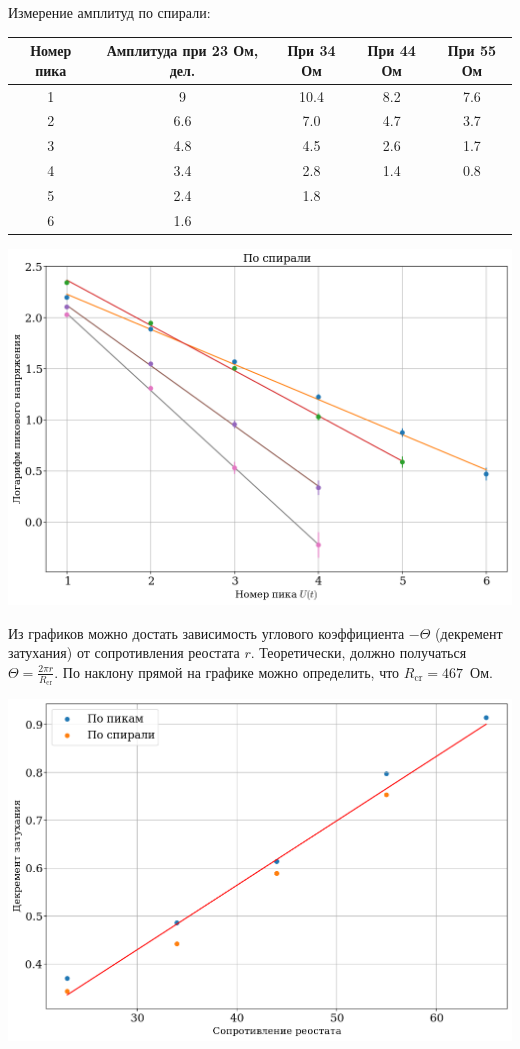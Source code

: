 \documentclass[a4paper, 12pt]{article}
\begin{document}
Измерение амплитуд по спирали:

\begin{tabular}{|c|c|c|c|c|}
\hline
Номер пика & Амплитуда при 23 Ом, дел. & При 34 Ом & При 44 Ом & При 55 Ом \\ \hline
1 & 9    & 10.4 & 8.2 & 7.6  \\ \hline
2 & 6.6  & 7.0  & 4.7 & 3.7  \\ \hline
3 & 4.8  & 4.5  & 2.6 & 1.7  \\ \hline
4 & 3.4  & 2.8  & 1.4 & 0.8  \\ \hline
5 & 2.4  & 1.8  &     &      \\ \hline       
6 & 1.6  &      &     &      \\ \hline      
\end{tabular}
\begin{center}
\includegraphics[width=0.7\linewidth]{qfactor_peaks_spiral.png}
\end{center}

Из графиков можно достать зависимость углового коэффициента $-\Theta$ (декремент затухания) от сопротивления реостата $r$.
Теоретически, должно получаться $\Theta = \frac{2 \pi r}{R_{\text{cr}}}$.
По наклону прямой на графике можно определить, что $R_{\text{cr}} = 467$~Ом.

\begin{center}
\includegraphics[width=0.7\linewidth]{qfactor_prop_r.png}
\end{center}
\end{document}
